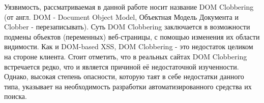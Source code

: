 Уязвимость, рассматриваемая в данной работе носит название DOM Clobbering (от англ. DOM - Document Object Model, Объектная Модель Документа и Clobber - перезаписывать). Суть DOM Clobbering заключается в возможности подмены объектов (переменных) веб-страницы, с помощью изменения их области видимости. Как и DOM-based XSS, DOM Clobbering - это недостаток целиком на стороне клиента. Стоит отметить, что в реальных сайтах DOM Clobbering встречается редко, что и является причиной её недостаточной изученности. Однако, высокая степень опасности, которую таят в себе недостатки данного типа, указывает на необходимость разработки автоматизированного средства их поиска.